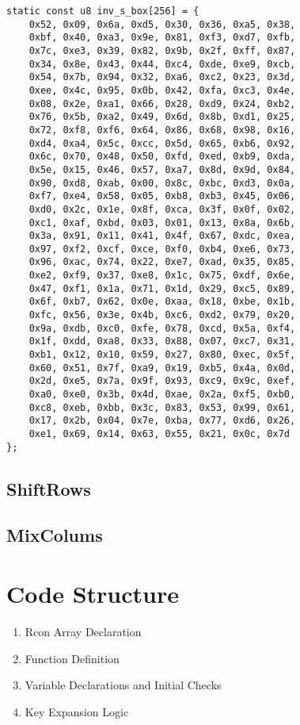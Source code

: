 \newpage
\begin{lstlisting}[style=C, caption={Invserse S-Box},captionpos=t]
static const u8 inv_s_box[256] = {
	0x52, 0x09, 0x6a, 0xd5, 0x30, 0x36, 0xa5, 0x38,
	0xbf, 0x40, 0xa3, 0x9e, 0x81, 0xf3, 0xd7, 0xfb,
	0x7c, 0xe3, 0x39, 0x82, 0x9b, 0x2f, 0xff, 0x87,
	0x34, 0x8e, 0x43, 0x44, 0xc4, 0xde, 0xe9, 0xcb,
	0x54, 0x7b, 0x94, 0x32, 0xa6, 0xc2, 0x23, 0x3d,
	0xee, 0x4c, 0x95, 0x0b, 0x42, 0xfa, 0xc3, 0x4e,
	0x08, 0x2e, 0xa1, 0x66, 0x28, 0xd9, 0x24, 0xb2,
	0x76, 0x5b, 0xa2, 0x49, 0x6d, 0x8b, 0xd1, 0x25,
	0x72, 0xf8, 0xf6, 0x64, 0x86, 0x68, 0x98, 0x16,
	0xd4, 0xa4, 0x5c, 0xcc, 0x5d, 0x65, 0xb6, 0x92,
	0x6c, 0x70, 0x48, 0x50, 0xfd, 0xed, 0xb9, 0xda,
	0x5e, 0x15, 0x46, 0x57, 0xa7, 0x8d, 0x9d, 0x84,
	0x90, 0xd8, 0xab, 0x00, 0x8c, 0xbc, 0xd3, 0x0a,
	0xf7, 0xe4, 0x58, 0x05, 0xb8, 0xb3, 0x45, 0x06,
	0xd0, 0x2c, 0x1e, 0x8f, 0xca, 0x3f, 0x0f, 0x02,
	0xc1, 0xaf, 0xbd, 0x03, 0x01, 0x13, 0x8a, 0x6b,
	0x3a, 0x91, 0x11, 0x41, 0x4f, 0x67, 0xdc, 0xea,
	0x97, 0xf2, 0xcf, 0xce, 0xf0, 0xb4, 0xe6, 0x73,
	0x96, 0xac, 0x74, 0x22, 0xe7, 0xad, 0x35, 0x85,
	0xe2, 0xf9, 0x37, 0xe8, 0x1c, 0x75, 0xdf, 0x6e,
	0x47, 0xf1, 0x1a, 0x71, 0x1d, 0x29, 0xc5, 0x89,
	0x6f, 0xb7, 0x62, 0x0e, 0xaa, 0x18, 0xbe, 0x1b,
	0xfc, 0x56, 0x3e, 0x4b, 0xc6, 0xd2, 0x79, 0x20,
	0x9a, 0xdb, 0xc0, 0xfe, 0x78, 0xcd, 0x5a, 0xf4,
	0x1f, 0xdd, 0xa8, 0x33, 0x88, 0x07, 0xc7, 0x31,
	0xb1, 0x12, 0x10, 0x59, 0x27, 0x80, 0xec, 0x5f,
	0x60, 0x51, 0x7f, 0xa9, 0x19, 0xb5, 0x4a, 0x0d,
	0x2d, 0xe5, 0x7a, 0x9f, 0x93, 0xc9, 0x9c, 0xef,
	0xa0, 0xe0, 0x3b, 0x4d, 0xae, 0x2a, 0xf5, 0xb0,
	0xc8, 0xeb, 0xbb, 0x3c, 0x83, 0x53, 0x99, 0x61,
	0x17, 0x2b, 0x04, 0x7e, 0xba, 0x77, 0xd6, 0x26,
	0xe1, 0x69, 0x14, 0x63, 0x55, 0x21, 0x0c, 0x7d
};
\end{lstlisting}

\subsection{ShiftRows}
\subsection{MixColums}

\newpage
\section{Code Structure}
\begin{enumerate}
	\item Rcon Array Declaration
	\item Function Definition
	\item Variable Declarations and Initial Checks
	\item Key Expansion Logic
\end{enumerate}

